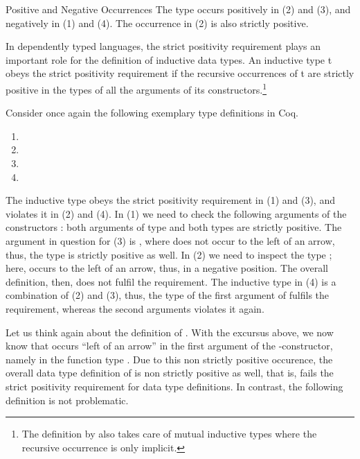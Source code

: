 \begin{excursus}{Positive and Negative Occurrences}
The type  occurs positively in (2) and (3), and negatively in (1) and (4).
The occurrence in (2) is also strictly positive.

In dependently typed languages, the strict positivity requirement plays an important role for the definition of inductive data types.
An inductive type t obeys the strict positivity requirement if the recursive occurrences of t are strictly positive in the types of all the arguments of its constructors.\footnote{The definition by \citeauthor{blanqui2002inductivedatatype} also takes care of mutual inductive types where the recursive occurrence is only implicit.}

Consider once again the following exemplary type definitions in Coq.

\begin{enumerate}
\item[(1)] 
\item[(2)] 
\item[(3)] 
\item[(4)] 
\end{enumerate}

The inductive type  obeys the strict positivity requirement in (1) and (3), and violates it in (2) and (4).
In (1) we need to check the following arguments of the constructors : both arguments of type  and both types are strictly positive.
The argument in question for (3) is , where  does not occur to the left of an arrow, thus, the type is strictly positive as well.
In (2) we need to inspect the type ; here,  occurs to the left of an arrow, thus, in a negative position.
The overall definition, then, does not fulfil the requirement.
The inductive type in (4) is a combination of (2) and (3), thus, the type of the first argument of  fulfils the requirement, whereas the second arguments violates it again.
\end{excursus}

Let us think again about the definition of .
With the excursus above, we now know that  occurs ``left of an arrow''  in the first argument of the -constructor, namely in the function type .
Due to this non strictly positive occurence, the overall data type definition of  is non strictly positive as well, that is, fails the strict positivity requirement for data type definitions.
In contrast, the following definition is not problematic.

